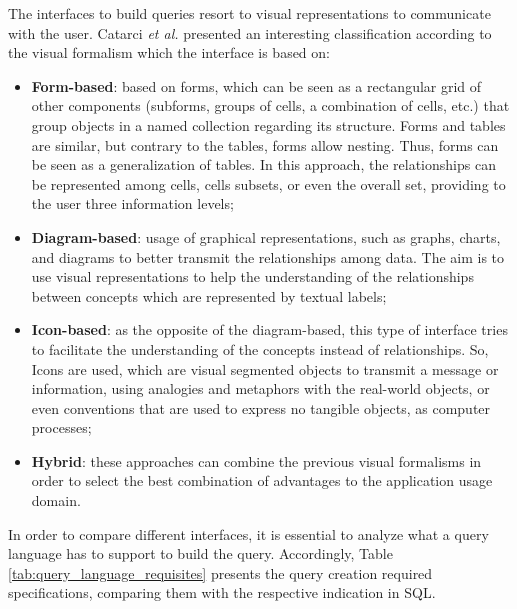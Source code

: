 The interfaces to build queries resort to visual representations to communicate with the user. Catarci \textit{et al.} \cite{visualQuerySystemsForDatabases_aSurvey} presented an interesting classification according to the visual formalism which the interface is based on:

\begin{itemize}
    \item \textbf{Form-based}: based on forms, which can be seen as a rectangular grid of other components (subforms, groups of cells, a combination of cells, etc.) that group objects in a named collection regarding its structure. Forms and tables are similar,  but contrary to the tables, forms allow nesting. Thus, forms can be seen as a generalization of tables. In this approach, the relationships can be represented among cells, cells subsets, or even the overall set, providing to the user three information levels; %
    \item \textbf{Diagram-based}: usage of graphical representations, such as graphs, charts, and diagrams to better transmit the relationships among data. The aim is to use visual representations to help the understanding of the relationships between concepts which are represented by textual labels;
    \item \textbf{Icon-based}: as the opposite of the diagram-based, this type of interface tries to facilitate the understanding of the concepts instead of relationships. So, Icons are used, which are visual segmented objects to transmit a message or information, using analogies and metaphors with the real-world objects, or even conventions that are used to express no tangible objects, as computer processes;
    \item \textbf{Hybrid}: these approaches can combine the previous visual formalisms in order to select the best combination of advantages to the application usage domain.
\end{itemize}

In order to compare different interfaces, it is essential to analyze what a query language has to support to build the query. Accordingly, Table \ref{tab:query_language_requisites} presents the query creation required specifications, comparing them with the respective indication in \gls{SQL}.

